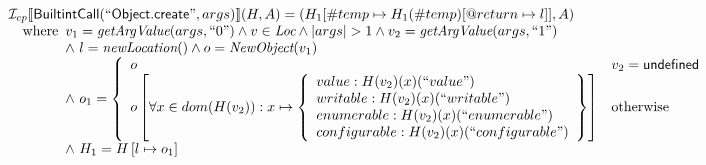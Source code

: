 \[\begin{array}{l}
\mathcal{I} _{cp}\llbracket \mbox{\textsf{BuiltintCall}}(``\mbox{\textsf{Object.create}}",args)\rrbracket(H,A)
 = (H_1[\#temp \mapsto H_1(\#temp)[@return \mapsto l]], A)\\
\quad{\rm where}\begin{array}[t]{l}
  v_1 = \emph{getArgValue}(args, ``0") \land v \in\emph{Loc}
  \land |args| > 1 \land v_2 = \emph{getArgValue}(args, ``1")\\
  \land\ l=\emph{newLocation}() \land o=\emph{NewObject}(v_1)\\
  \land\ o_1 = \left\{\begin{array}{ll}
    o & v_2 = \mbox{\textsf{undefined}}\\
    o\left[
    \forall x\in dom(H(v_2)): x \mapsto \left\{
      \begin{array}{l}
        value: H(v_2)(x)(``value")\\
        writable: H(v_2)(x)(``writable") \\
        enumerable: H(v_2)(x)(``enumerable")\\
        configurable: H(v_2)(x)(``configurable")\\
      \end{array}
      \right\}
    \right]  & {\rm otherwise}\\  
    \end{array}\right.\\
  \land\ H_1 = H\left[l\mapsto o_1\right]\end{array}\\
\end{array}
\]


